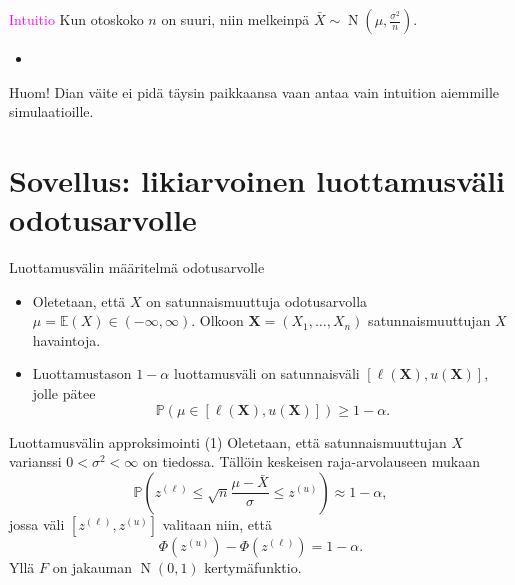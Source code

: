 \documentclass{beamer}
\DeclareMathOperator{\n}{\mathrm N}
\begin{document}

\begin{frame}{\textcolor{magenta}{Intuitio}}
  Kun otoskoko $n$ on suuri, niin melkeinpä $\bar X \sim \n\left(\mu,
  \frac{\sigma^2}{n}\right)$.
  \begin{itemize}
    \item[]
  \end{itemize}
  \pause
  Huom! Dian väite ei pidä täysin paikkaansa vaan antaa vain intuition aiemmille
  simulaatioille.
\end{frame}


\section{Sovellus: likiarvoinen luottamusväli odotusarvolle}


\begin{frame}{Luottamusvälin määritelmä odotusarvolle}
  \begin{itemize}
    \item Oletetaan, että $X$ on satunnaismuuttuja odotusarvolla $\mu =
    \mathbb{E}\left(X\right)\in(-\infty, \infty)$. Olkoon $\bm X = (X_1, \ldots,
    X_n)$ satunnaismuuttujan $X$ havaintoja.
    \pause
    \item Luottamustason $1-\alpha$ luottamusväli on satunnaisväli
    $\left[\ell\left(\bm X\right), u\left(\bm X\right)\right]$, jolle pätee
    \begin{equation*}
      \mathbb{P}\left(\mu\in\left[\ell\left(\bm X\right), u\left(\bm
      X\right)\right]\right) \geq 1 - \alpha.
    \end{equation*}
  \end{itemize}
\end{frame}


\begin{frame}{Luottamusvälin approksimointi (1)}
  Oletetaan, että satunnaismuuttujan $X$ varianssi $0 < \sigma^2 < \infty$ on
  tiedossa. Tällöin keskeisen raja-arvolauseen mukaan
  \begin{equation*}
    \mathbb{P}\left(z^{(\ell)} \leq \sqrt{n}\frac{\mu - \bar X}{\sigma}
    \leq z^{(u)}\right) \approx 1 - \alpha,
  \end{equation*}
  \pause
  jossa väli $[z^{(\ell)}, z^{(u)}]$ valitaan niin, että
  \begin{equation*}
    \Phi(z^{(u)}) - \Phi(z^{(\ell)}) = 1-\alpha.
  \end{equation*}
  Yllä $F$ on jakauman $\n\left(0,1\right)$ kertymäfunktio.
\end{frame}
\end{document}
